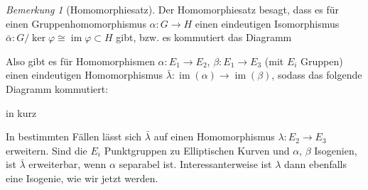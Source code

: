 \documentclass[english, german, parskip=half]{scrartcl}
\theoremstyle{definition}
\theoremstyle{remark}
\newtheorem{Bemerkung}[Satz]{Bemerkung}
\DeclareMathOperator{\im}{im} %
\begin{document}
\begin{Bemerkung}[Homomorphiesatz]
  Der Homomorphiesatz besagt, dass es für
  einen Gruppenhomomorphismus $\alpha\colon G\to H$ einen eindeutigen
  Isomorphismus 
  $\bar\alpha\colon G/\ker\varphi\cong \im\varphi\subset H$ gibt, bzw.
  es kommutiert das Diagramm
  \begin{center}
  \end{center}
  Also gibt es für Homomorphismen $\alpha\colon E_1\to E_2$,
  $\beta\colon E_1\to E_3$ (mit $E_i$ Gruppen) einen eindeutigen
  Homomorphismus $\bar\lambda\colon \im(\alpha)\to\im(\beta)$, 
  sodass das folgende Diagramm kommutiert:
  \begin{center}
    \hfill
    in kurz
    \hfill
  \end{center}
  In bestimmten Fällen lässt sich $\bar\lambda$ auf einen
  Homomorphismus $\lambda\colon E_2\to E_3$ erweitern.
  Sind die $E_i$ Punktgruppen zu Elliptischen Kurven 
  und $\alpha$, $\beta$ Isogenien, ist $\bar\lambda$ erweiterbar, 
  wenn $\alpha$ separabel ist. Interessanterweise ist $\lambda$ dann
  ebenfalls eine Isogenie, wie wir jetzt werden.
\end{Bemerkung}
\end{document}
